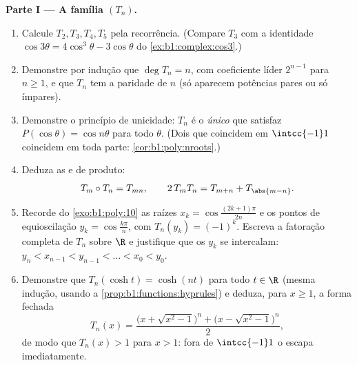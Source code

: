 \begin{problem}
\medskip
\noindent\textbf{Parte I --- A família $(T_n)$.}
\begin{enumerate}
  \item Calcule $T_2, T_3, T_4, T_5$ pela recorrência. (Compare
        $T_3$ com a identidade $\cos3\theta = 4\cos^3\theta -
        3\cos\theta$ do \cref{ex:b1:complex:cos3}.)
  \item Demonstre por indução que $\deg T_n = n$, com coeficiente
        líder $2^{n-1}$ para $n \geq 1$, e que $T_n$ tem a
        paridade de $n$ (só aparecem potências pares ou só ímpares).
  \item Demonstre o princípio de unicidade: $T_n$ é o \emph{único}
         que satisfaz $P(\cos\theta) = \cos n\theta$ para
        todo $\theta$. (Dois  que coincidem em $\intcc{-1}1$
        coincidem em toda parte: \cref{cor:b1:poly:nroots}.)
  \item Deduza as  e de produto:
        \[
        T_m \circ T_n = T_{mn},
        \qquad
        2\,T_m T_n = T_{m+n} + T_{\abs{m-n}} .
        \]
  \item Recorde do \cref{exo:b1:poly:10} as raízes $x_k =
        \cos\frac{(2k+1)\pi}{2n}$ e os pontos de equioscilação
        $y_k = \cos\frac{k\pi}n$, com $T_n(y_k) = (-1)^k$. Escreva
        a fatoração completa de $T_n$ sobre $\R$ e
        justifique que os $y_k$ se intercalam: $y_n < x_{n-1} < y_{n-1}
        < \dots < x_0 < y_0$.
  \item Demonstre que $T_n(\cosh t) = \cosh(nt)$ para todo $t \in \R$
        (mesma indução, usando a
        \cref{prop:b1:functions:hyprules}) e deduza, para $x
        \geq 1$, a forma fechada
        \[
        T_n(x) = \frac{\bigl(x + \sqrt{x^2 - 1}\bigr)^n +
        \bigl(x - \sqrt{x^2 - 1}\bigr)^n}{2} ,
        \]
        de modo que $T_n(x) > 1$ para $x > 1$: fora de $\intcc{-1}1$ o
         escapa imediatamente.
\end{enumerate}


\end{problem}
